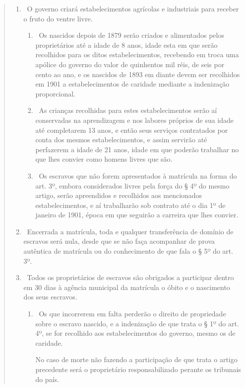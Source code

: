 \begin{quote}
\begin{enumerate}[label=Art. \arabic*º]
\item\ O governo criará estabelecimentos agrícolas e industriais para
receber o fruto do ventre livre.

\begin{enumerate}[label=§ \arabic*º]
\item\ Os nascidos depois de 1879 serão criados e alimentados pelos
proprietários até a idade de 8 anos, idade esta em que serão recolhidos
para os ditos estabelecimentos, recebendo em troca uma apólice do
governo do valor de quinhentos mil réis, de seis por cento ao ano, e os
nascidos de 1893 em diante devem ser recolhidos em 1901 a
estabelecimentos de caridade mediante a indenização proporcional.

\item\ As crianças recolhidas para estes estabelecimentos serão aí
conservadas na aprendizagem e nos labores próprios de sua idade até
completarem 13 anos, e então seus serviços contratados por conta dos
mesmos estabelecimentos, e assim servirão até perfazerem a idade de 21
anos, idade em que poderão trabalhar no que lhes convier como homens
livres que são.

\item\ Os escravos que não forem apresentados à matrícula na forma do
art. 3º, embora considerados livres pela força do § 4º do mesmo artigo,
serão apreendidos e recolhidos aos mencionados estabelecimentos, e aí
trabalharão sob contrato até o dia 1º de janeiro de 1901, época em que
seguirão a carreira que lhes convier.
\end{enumerate}

\item\ Encerrada a matrícula, toda e qualquer transferência de domínio
de escravos será nula, desde que se não faça acompanhar de prova
autêntica de matrícula ou do conhecimento de que fala o § 5º do art.
3º.

\item\ Todos os proprietários de escravos são obrigados a participar
dentro em 30 dias à agência municipal da matrícula o óbito e o
nascimento dos seus escravos.

\begin{enumerate}[label=§ \arabic*º]
\item\ Os que incorrerem em falta perderão o direito de propriedade sobre
o escravo nascido, e a indenização de que trata o § 1º do art. 4º, se
for recolhido aos estabelecimentos do governo, mesmo os de caridade.

No caso de morte não fazendo a participação de que trata o artigo
precedente será o proprietário responsabilizado perante os tribunais do
país.


\end{enumerate}
\end{enumerate}
\end{quote}
